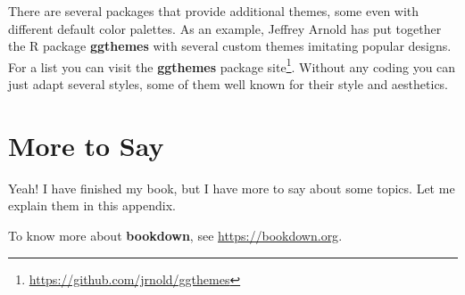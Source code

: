 \documentclass[
]{krantz}
\renewcommand{\href}[2]{#2\footnote{\url{#1}}}
\begin{document}
There are several packages that provide additional themes, some even with different default color palettes. As an example, Jeffrey Arnold has put together the R package \textbf{ggthemes} with several custom themes imitating popular designs. For a list you can visit the \href{https://github.com/jrnold/ggthemes}{\textbf{ggthemes} package site}. Without any coding you can just adapt several styles, some of them well known for their style and aesthetics.

\cleardoublepage

\hypertarget{appendix-appendix}{%
\appendix {}}


\hypertarget{more-to-say}{%
\chapter{More to Say}\label{more-to-say}}

Yeah! I have finished my book, but I have more to say about some topics. Let me explain them in this appendix.

To know more about \textbf{bookdown}, see \url{https://bookdown.org}.

  

\backmatter
\printindex
\end{document}
